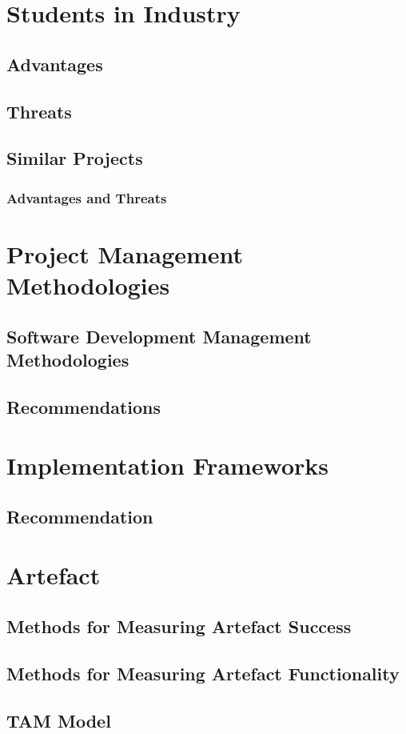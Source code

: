 \section{Students in Industry}
\subsection{Advantages}
\subsection{Threats}
\subsection{Similar Projects}
\subsubsection{Advantages and Threats}
\section{Project Management Methodologies}
\subsection{Software Development Management Methodologies}
\subsection{Recommendations}
\section{Implementation Frameworks}
\subsection{Recommendation}
\section{Artefact}
\subsection{Methods for Measuring Artefact Success}
\subsection{Methods for Measuring Artefact Functionality}
\subsection{TAM Model}